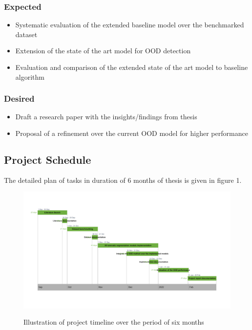 \documentclass[thesis]{mas_proposal}
\begin{document}
\subsubsection*{Expected}
\begin{itemize}
    \item Systematic evaluation of the extended baseline model over the benchmarked dataset
    \item Extension of the state of the art model for OOD detection
    \item Evaluation and comparison of the extended state of the art model to baseline algorithm
\end{itemize}

\subsubsection*{Desired}
\begin{itemize}
    \item Draft a research paper with the insights/findings from thesis
    \item Proposal of a refinement over the current OOD model for higher performance
\end{itemize}

\subsection{Project Schedule}
The detailed plan of tasks in duration of 6 months of thesis is given in figure 1.

\begin{figure}[h!]
    \centering
    \caption{Illustration of project timeline over the period of six months}
    \includegraphics[scale=0.16]{images/rnd_deliverable_timeline}
    \label{fig:schedl}
\end{figure}

\nocite{*}


\end{document}
